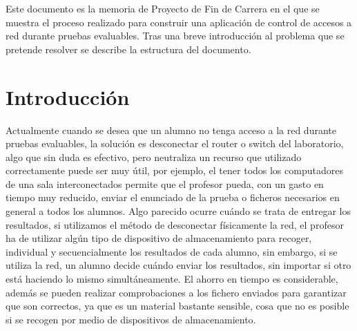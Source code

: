 


\label{chap:introduction}


Este documento es la memoria de Proyecto de Fin de Carrera en el que se muestra el proceso realizado para construir una aplicación de control de accesos a red durante pruebas evaluables. Tras una breve introducción al problema que se pretende resolver se describe la estructura del documento.


\minitoc

\section{Introducción}
\label{sec:intr:introduction}


Actualmente cuando se desea que un alumno no tenga acceso a la red durante pruebas evaluables, la solución es desconectar el router o switch del laboratorio, algo que sin duda es efectivo, pero neutraliza un recurso que utilizado correctamente puede ser muy útil, por ejemplo, el tener todos los computadores de una sala interconectados permite que el profesor pueda, con un gasto en tiempo muy reducido, enviar el enunciado de la prueba o ficheros necesarios en general a todos los alumnos. Algo parecido ocurre cuándo se trata de entregar los resultados, si utilizamos el método de desconectar físicamente la red, el profesor ha de utilizar algún tipo de dispositivo de almacenamiento para recoger, individual y secuencialmente los resultados de cada alumno, sin embargo, si se utiliza la red, un alumno decide cuándo enviar los resultados, sin importar si otro está haciendo lo mismo simultáneamente. El ahorro en tiempo es considerable, además se pueden realizar comprobaciones a los fichero enviados para garantizar que son correctos, ya que es un material bastante sensible, cosa que no es posible si se recogen por medio de dispositivos de almacenamiento.


